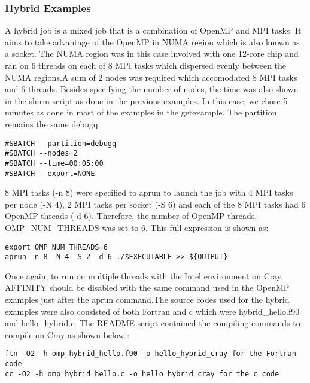 \subsubsection{Hybrid Examples}

A hybrid job is a mixed job that is a combination of OpenMP and MPI tasks. It aims to take advantage of the OpenMP in NUMA region which is also known as 
a socket. The NUMA region was in this case involved with one 12-core chip and ran on 6 threads on each of 8 MPI tasks which dispersed evenly between 
the NUMA regions.A sum of 2 nodes was required which accomodated 8 MPI tasks and 6 threads. Besides specifying the number of nodes, the time was also shown in the slurm 
script as done in the previous examples. In this case, we chose 5 minutes as done in most of the examples in the getexample.
The partition remains the same debugq.


\begin{tcolorbox}
\begin{Verbatim}[fontsize=\scriptsize]
#SBATCH --partition=debugq
#SBATCH --nodes=2
#SBATCH --time=00:05:00
#SBATCH --export=NONE
\end{Verbatim}
\end{tcolorbox}

8 MPI tasks (-n 8) were specified to aprun to launch the job with 4 MPI tasks per node (-N 4), 2 MPI tasks per socket (-S 6) and each of the 8 MPI tasks 
had 6 OpenMP threads (-d 6). Therefore, the number of OpenMP threads, OMP\_NUM\_THREADS was set to 6.
This full expression is shown as:

\begin{tcolorbox}
\begin{Verbatim}[fontsize=\scriptsize]
export OMP_NUM_THREADS=6
aprun -n 8 -N 4 -S 2 -d 6 ./$EXECUTABLE >> ${OUTPUT}
\end{Verbatim}
\end{tcolorbox}

Once again, to run on multiple threads with the Intel environment on Cray, AFFINITY should be disabled with the same command used in the OpenMP examples
just after the aprun command.The source codes used for the hybrid examples were also consisted of both Fortran and c which were hybrid\_hello.f90 and hello\_hybrid.c. The README 
script contained the compiling commands to compile on Cray as shown below :

\begin{tcolorbox}
\begin{Verbatim}[fontsize=\scriptsize]
ftn -O2 -h omp hybrid_hello.f90 -o hello_hybrid_cray for the Fortran code
cc -O2 -h omp hybrid_hello.c -o hello_hybrid_cray for the c code
\end{Verbatim}
\end{tcolorbox}

